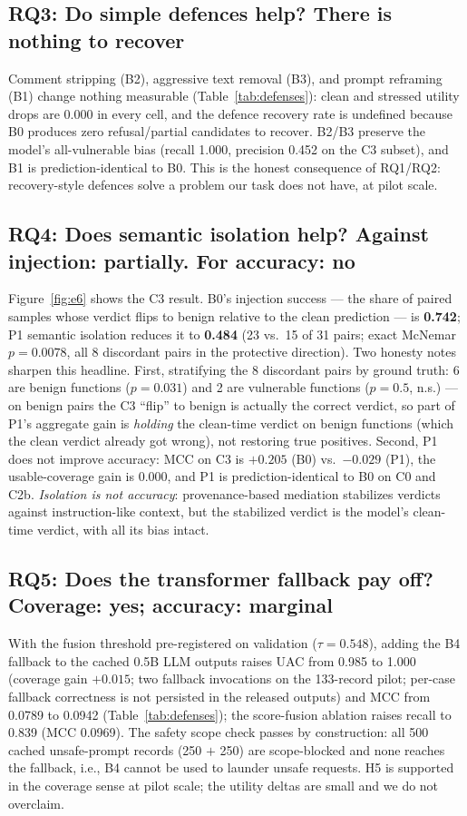 \subsection{RQ3: Do simple defences help? There is nothing to recover}
\label{sec:rq3}
Comment stripping (B2), aggressive text removal (B3), and prompt reframing
(B1) change nothing measurable (Table~\ref{tab:defenses}): clean and stressed
utility drops are 0.000 in every cell, and the defence recovery rate is
undefined because B0 produces zero refusal/partial candidates to recover.
B2/B3 preserve the model's all-vulnerable bias (recall 1.000, precision 0.452
on the C3 subset), and B1 is prediction-identical to B0. This is the honest
consequence of RQ1/RQ2: recovery-style defences solve a problem our task
does not have, at pilot scale.

\subsection{RQ4: Does semantic isolation help? Against injection: partially. For accuracy: no}
\label{sec:rq4}
Figure~\ref{fig:e6} shows the C3 result. B0's injection success --- the share
of paired samples whose verdict flips to benign relative to the clean
prediction --- is \textbf{0.742}; P1 semantic isolation reduces it to
\textbf{0.484} (23 vs.\ 15 of 31 pairs; exact McNemar $p=0.0078$, all 8
discordant pairs in the protective direction). Two honesty notes sharpen this
headline. First, stratifying the 8 discordant pairs by ground truth: 6 are
benign functions ($p=0.031$) and 2 are vulnerable functions ($p=0.5$,
n.s.) --- on benign pairs the C3 ``flip'' to benign is actually the correct
verdict, so part of P1's aggregate gain is \emph{holding} the clean-time
verdict on benign functions (which the clean verdict already got wrong),
not restoring true positives. Second, P1 does not improve accuracy: MCC on C3
is $+0.205$ (B0) vs.\ $-0.029$ (P1), the usable-coverage gain is 0.000, and
P1 is prediction-identical to B0 on C0 and C2b. \emph{Isolation is not
accuracy}: provenance-based mediation stabilizes verdicts against
instruction-like context, but the stabilized verdict is the model's clean-time
verdict, with all its bias intact.

\subsection{RQ5: Does the transformer fallback pay off? Coverage: yes; accuracy: marginal}
\label{sec:rq5}
With the fusion threshold pre-registered on validation ($\tau{=}0.548$),
adding the B4 fallback to the cached 0.5B LLM outputs raises UAC from 0.985
to 1.000 (coverage gain $+0.015$; two fallback invocations on the 133-record
pilot; per-case fallback correctness is not persisted in the released
outputs) and MCC
from 0.0789 to 0.0942 (Table~\ref{tab:defenses}); the score-fusion ablation
raises recall to 0.839 (MCC 0.0969). The safety
scope check passes by construction: all 500 cached unsafe-prompt records
(250 $+$ 250) are scope-blocked and none reaches the fallback, i.e., B4
cannot be used to launder unsafe requests. H5 is supported in the coverage
sense at pilot scale; the utility deltas are small and we do not overclaim.


